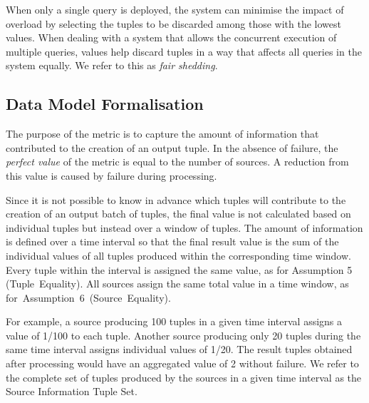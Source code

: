 When only a single query is deployed, the system can minimise the impact of overload by selecting the
tuples to be discarded among those with the lowest \sic values.
When dealing with a system that allows the concurrent execution of multiple queries, \sic values
help discard tuples in a way that affects all queries in the system equally.
We refer to this as \textit{fair shedding}. 

\subsection*{Data Model Formalisation} 
\label{sec:sits}
The purpose of the \sic metric is to capture the amount of information that contributed to the creation
of an output tuple. In the absence of failure, the \emph{perfect value} of the \sic metric is equal to
the number of sources. A reduction from this value is caused by failure during processing. 

Since it is not possible to know in advance which tuples will contribute to the creation of an output
batch of tuples, the final \sic value is not calculated based on individual tuples but instead over a
window of tuples. The amount of information is defined over a time interval so that the final result \sic value
is the sum of the individual \sic values of all tuples produced within the corresponding time window.
Every tuple within the interval is assigned the same value, as for Assumption 5 (Tuple~Equality). All
sources assign the same total \sic value in a time window, as for~Assumption~6~(Source~Equality).

For example, a source producing 100 tuples in a given time interval
assigns a \sic value of 1/100 to each tuple. Another source producing only 20 tuples during the same
time interval assigns individual \sic values of 1/20. The result tuples obtained after processing
would have an aggregated \sic value of 2 without failure.
We refer to the complete set of tuples produced by the sources in a given time interval as the
Source Information Tuple Set.

